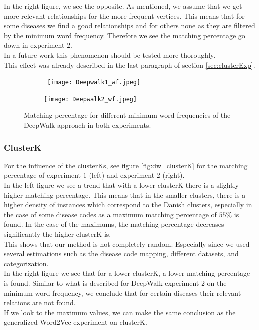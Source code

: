 In the right figure, we see the opposite. As mentioned, we assume that we get more relevant relationships for the more frequent vertices. This means that for some diseases we find a good relationships and for others none as they are filtered by the minimum word frequency. Therefore we see the matching percentage go down in experiment $2$. \\
In a future work this phenomenon should be tested more thoroughly. \\

This effect was already described in the last paragraph of section \ref{sec:clusterExp}.

\begin{figure}[!htb]
	\centering
	\begin{subfigure}[b]{.49\textwidth}\
		\texttt{[image: Deepwalk1\_wf.jpeg]}
	\end{subfigure}
	\begin{subfigure}[b]{.49\textwidth}
		\texttt{[image: Deepwalk2\_wf.jpeg]}
	\end{subfigure}
	\caption{Matching percentage for different minimum word frequencies of the DeepWalk approach in both experiments.}
	\label{fig:dw_wf}
\end{figure}



\subsubsection{ClusterK}

For the influence of the clusterKs, see figure \ref{fig:dw_clusterK} for the matching percentage of experiment $1$ (left) and experiment $2$ (right). \\

In the left figure we see a trend that with a lower clusterK there is a slightly higher matching percentage. This means that in the smaller clusters, there is a higher density of instances which correspond to the Danish clusters, especially in the case of some disease codes as a maximum matching percentage of $55$\% is found. In the case of the maximums, the matching percentage decreases significantly the higher clusterK is. \\
This shows that our method is not completely random. Especially since we used several estimations such as the disease code mapping, different datasets, and categorization. \\

In the right figure we see that for a lower clusterK, a lower matching percentage is found. Similar to what is described for DeepWalk experiment $2$ on the minimum word frequency, we conclude that for certain diseases their relevant relations are not found. \\
If we look to the maximum values, we can make the same conclusion as the generalized Word2Vec experiment on clusterK.

